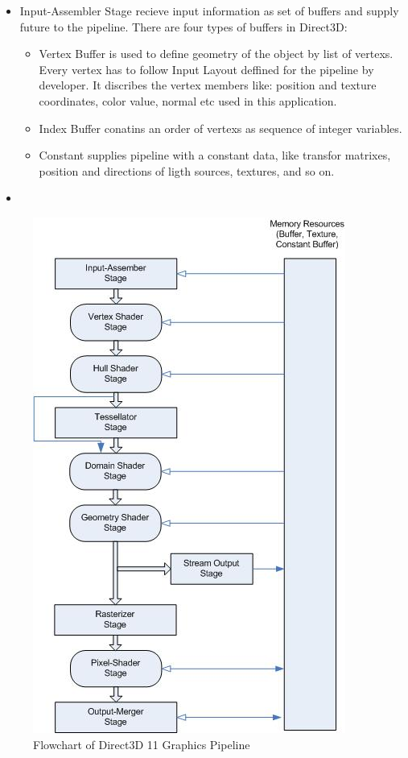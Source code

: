 \documentclass[twoside, english, 11pt]{report}
\begin{document}
\begin{itemize}
\item Input-Assembler Stage recieve input information as set of buffers and supply future to the pipeline. There are four types of buffers in Direct3D:
  \begin{itemize}
    \item Vertex Buffer is used to define geometry of the object by list of vertexs. Every vertex has to follow Input Layout deffined for the pipeline by developer. It discribes the vertex members like: position and texture coordinates, color value, normal etc used in this application.
    \item Index Buffer conatins an order of vertexs as sequence of integer variables.
    \item Constant supplies pipeline with a constant data, like transfor matrixes, position and directions of ligth sources, textures, and so on.
  \end{itemize}
\item 
\end{itemize}

\begin{figure}[h]
\centerline{\includegraphics{img/pipeline}}
\caption{Flowchart of Direct3D 11 Graphics Pipeline\label{fig:pipeline}}
\end{figure}
\end{document}
